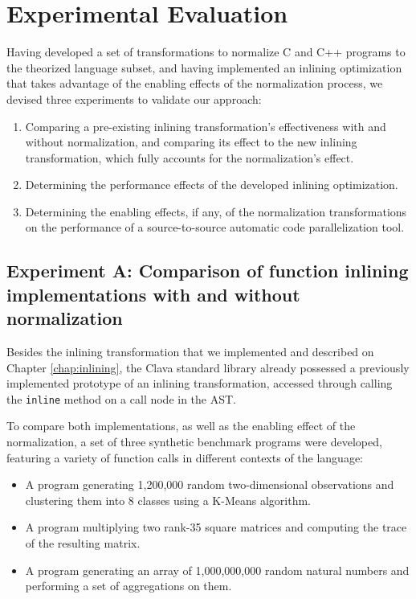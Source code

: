 \chapter{Experimental Evaluation}\label{chap:evaluation}

Having developed a set of transformations to normalize C and C++ programs to the theorized language subset, and having implemented an inlining optimization that takes advantage of the enabling effects of the normalization process, we devised three experiments to validate our approach:

\begin{enumerate}[label=\Alph*]
    \item Comparing a pre-existing inlining transformation's effectiveness with and without normalization, and comparing its effect to the new inlining transformation, which fully accounts for the normalization's effect.
    \item Determining the performance effects of the developed inlining optimization.
    \item Determining the enabling effects, if any, of the normalization transformations on the performance of a source-to-source automatic code parallelization tool.
\end{enumerate}

\section{Experiment A: Comparison of function inlining implementations with and without normalization}

Besides the inlining transformation that we implemented and described on Chapter \ref{chap:inlining}, the Clava standard library already possessed a previously implemented prototype of an inlining transformation, accessed through calling the \texttt{inline} method on a call node in the AST.

To compare both implementations, as well as the enabling effect of the normalization, a set of three synthetic benchmark programs were developed, featuring a variety of function calls in different contexts of the language:

\begin{itemize}
    \item A program generating 1,200,000 random two-dimensional observations and clustering them into 8 classes using a K-Means algorithm.
    \item A program multiplying two rank-35 square matrices and computing the trace of the resulting matrix.
    \item A program generating an array of 1,000,000,000 random natural numbers and performing a set of aggregations on them.
\end{itemize}

